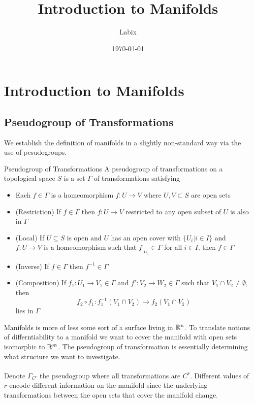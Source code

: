 \documentclass[a4paper]{article}
\title{Introduction to Manifolds}
\author{Labix}
\date{\today}
\begin{document}
\maketitle
\begin{abstract}
\end{abstract}
\pagebreak
\tableofcontents
\pagebreak

\section{Introduction to Manifolds}
\subsection{Pseudogroup of Transformations}
We establish the definition of manifolds in a slightly non-standard way via the use of pesudogroups. 

\begin{defn}{Pseudogroup of Transformations}{} A pseudogroup of transformations on a topological space $S$ is a set $\Gamma$ of transformations satisfying 
\begin{itemize}
\item Each $f\in\Gamma$ is a homeomorphism $f:U\to V$ where $U,V\subset S$ are open sets
\item (Restriction) If $f\in\Gamma$ then $f:U\to V$ restricted to any open subset of $U$ is also in $\Gamma$
\item (Local) If $U\subseteq S$ is open and $U$ has an open cover with $\{U_i|i\in I\}$ and $f:U\to V$ is a homeomorphism such that $f|_{U_i}\in\Gamma$ for all $i\in I$, then $f\in\Gamma$
\item (Inverse) If $f\in\Gamma$ then $f^{-1}\in\Gamma$
\item (Composition) If $f_1:U_1\to V_1\in\Gamma$ and $f':V_2\to W_2\in\Gamma$ such that $V_1\cap V_2\neq\emptyset$, then $$f_2\circ f_1:f_1^{-1}(V_1\cap V_2)\to f_2(V_1\cap V_2)$$ lies in $\Gamma$
\end{itemize}
\end{defn}

Manifolds is more of less some sort of a surface living in $\mathbb{R}^n$. To translate notions of differntiability to a manifold we want to cover the manifold with open sets isomorphic to $\mathbb{R}^m$. The pseudogroup of transformation is essentially determining what structure we want to investigate. \\~\\
Denote $\Gamma_{C^r}$ the pseudogroup where all transformations are $C^r$. Different values of $r$ encode different information on the manifold since the underlying transformations between the open sets that cover the manifold change. 
\end{document}
